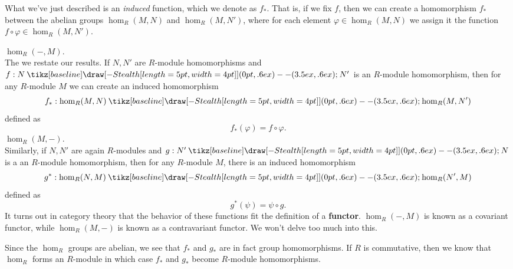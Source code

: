 \documentclass[12pt,letterpaper]{algebra_book}
\renewcommand{\to}{\mathbin{\tikz[baseline] \draw[-{Stealth[length=5pt,width=4pt]}] (0pt,.6ex) -- (3.5ex,.6ex);}}
\renewcommand{\phi}{\varphi}
\theoremstyle{definition}
\begin{document}
\begin{minipage}{0.6\textwidth}
    What we've just described is an \textit{induced} function,
    which we denote as $f_*$.
    That is, if we fix $f$, then we can create a homomorphism
    $f_*$  between the abelian groups $\hom_R(M, N)$ and
    $\hom_R(M, N')$, where for each element $\phi \in \hom_R(M, N)$
    we assign it the function $f \circ \phi \in \hom_R(M, N')$.
\end{minipage}
\hfill
\begin{minipage}{0.4\textwidth}
    \begin{center}
    \end{center}
\end{minipage}


\noindent $\hom_R(- , M)$.\\
The we restate our results. If $N, N'$ are $R$-module homomorphisms and $f: N \to N'$ is an $R$-module
homomorphism, then for any $R$-module $M$ we can create an induced
homomorphism 
\[ 
    f_* : \hom_R(M, N) \to \hom_R(M, N')
\] 
defined as 
\[
    f_*(\phi) = f \circ \phi.
\]
\noindent $\hom_R(M, -)$.\\
Similarly, if $N, N'$ are again $R$-modules and $g: N' \to N$ is a an
$R$-module homomorphism, then for any $R$-module $M$, there is
an induced homomorphism 
\[
    g^*: \hom_R(N, M) \to \hom_R(N', M)
\]
defined as 
\[
    g^*(\psi) = \psi \circ g.
\]
It turns out in category theory that the behavior of these
functions fit the definition of a \textbf{functor}.
$\hom_R(- , M)$ is known as a covariant functor,
while $\hom_R(M, -)$ is known as a contravariant
functor. We won't delve too much into this.

\textcolor{NavyBlue}{Since the $\hom_R$ groups are abelian, we see that $f_*$ and $g_*$
are in fact group homomorphisms. If $R$ is commutative, then we
know that $\hom_R$ forms an $R$-module in which case $f_*$ and
$g_*$ become $R$-module homomorphisms.}
\\
\end{document}
